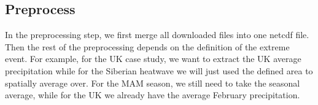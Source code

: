 \documentclass[letterpaper,10pt,english]{sphinxmanual}
\begin{document}
{
\begin{sphinxVerbatim}[commandchars=\\\{\}]
\llap{\color{nbsphinxin}[6]:\,\hspace{\fboxrule}\hspace{\fboxsep}}     \PYG{p}{[}\PYG{p}{]}
           \PYG{p}{[}   \PYG{p}{]}   
\end{sphinxVerbatim}
}


\subsection{Preprocess}
\label{\detokenize{Notebooks/Workflow:Preprocess}}
In the preprocessing step, we first merge all downloaded files into one netcdf file. Then the rest of the preprocessing depends on the definition of the extreme event. For example, for the UK case study, we want to extract the UK average precipitation while for the Siberian heatwave we will just used the defined area to spatially average over. For the MAM season, we still need to take the seasonal average, while for the UK we already have the average February precipitation.

{
\begin{sphinxVerbatim}[commandchars=\\\{\}]
\llap{\color{nbsphinxin}[7]:\,\hspace{\fboxrule}\hspace{\fboxsep}}       \PYG{p}{[}\PYG{p}{]}
\end{sphinxVerbatim}
}
\end{document}
